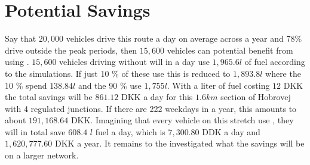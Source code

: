 \section{Potential Savings}%
Say that $20,000$ vehicles drive this route a day on average across a year and 78\% drive outside the peak periods, then $15,600$ vehicles can potential benefit from using \tech\cite{}.
$15,600$ vehicles driving without \tech will in a day use $1,965.6 l$ of fuel according to the simulations.
If just 10 \% of these use \tech this is reduced to $1,893.8 l$ where the 10 \% spend $138.84 l$ and the 90 \% use $1,755 l$.
With a liter of fuel costing $12$ DKK the total savings will be $861.12$ DKK a day for this $1.6 km$ section of Hobrovej with 4 regulated junctions.
If there are 222 weekdays in a year, this amounts to about $191,168.64$ DKK.
Imagining that every vehicle on this stretch use \tech, they will in total save $608.4$ $l$ fuel a day, which is $7,300.80$ DDK a day and $1,620,777.60$ DKK a year.
It remains to the investigated what the savings will be on a larger network.





